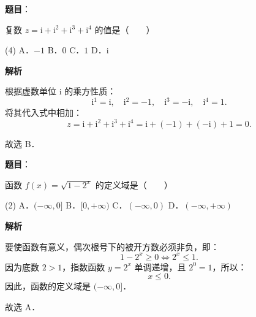 
\begin{answer}

\textbf{题目}：

复数 $z = \mathrm{i} + \mathrm{i}^2 + \mathrm{i}^3 + \mathrm{i}^4$ 的值是\mbox{（　　）}

\begin{gkopts}(4)
\task A．$-1$
\task B．$0$
\task C．$1$
\task D．$\mathrm{i}$
\end{gkopts}

\textbf{解析}

根据虚数单位 $\mathrm{i}$ 的乘方性质：
\nopagebreak[4]
\[
\mathrm{i}^1 = \mathrm{i}, \quad \mathrm{i}^2 = -1, \quad \mathrm{i}^3 = -\mathrm{i}, \quad \mathrm{i}^4 = 1.
\]
将其代入式中相加：
\nopagebreak[4]
\[
z = \mathrm{i} + \mathrm{i}^2 + \mathrm{i}^3 + \mathrm{i}^4 = \mathrm{i} + (-1) + (-\mathrm{i}) + 1 = 0.
\]

故选 B．


\end{answer}
\begin{answer}

\textbf{题目}：

函数 $f(x) = \sqrt{1 - 2^x}$ 的定义域是\mbox{（　　）}

\begin{gkopts}(2)
\task A．$(-\infty, 0]$
\task B．$[0, +\infty)$
\task C．$(-\infty, 0)$
\task D．$(-\infty, +\infty)$
\end{gkopts}

\textbf{解析}

要使函数有意义，偶次根号下的被开方数必须非负，即：
\nopagebreak[4]
\[
1 - 2^x \geqslant 0 \iff 2^x \leqslant 1.
\]
因为底数 $2 > 1$，指数函数 $y = 2^x$ 单调递增，且 $2^0 = 1$，所以：
\nopagebreak[4]
\[
x \leqslant 0.
\]
因此，函数的定义域是 $(-\infty, 0]$．

故选 A．


\end{answer}
